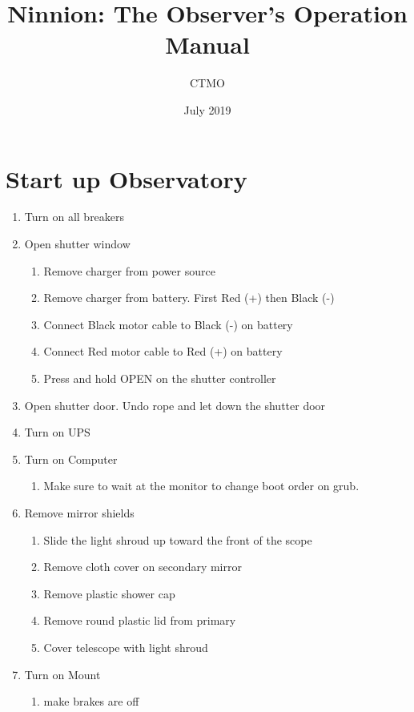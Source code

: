 \documentclass[12pt]{bookest}
\begin{document}
\title{Ninnion: The Observer's Operation Manual}
\author{CTMO}
\date{July 2019}

\maketitle
\tableofcontents


\chapter{Start up Observatory}
\begin{enumerate}
\item Turn on all breakers
\item Open shutter window
	\begin{enumerate}
	\item Remove charger from power source
	\item Remove charger  from battery. First Red (+) then Black (-)
	\item Connect Black motor cable to Black (-) on battery
	\item Connect Red motor cable to Red (+) on battery
	\item Press and hold OPEN on the shutter controller
	\end{enumerate}
\item Open shutter door. Undo rope and let down the shutter door
\item Turn on UPS
\item Turn on Computer
	\begin{enumerate}
	\item Make sure to wait at the monitor to change boot order on grub.
	\end{enumerate}
\item Remove mirror shields
	\begin{enumerate}
	\item Slide the light shroud up toward the front of the scope
	\item Remove cloth cover on secondary mirror
	\item Remove plastic shower cap 
	\item Remove round plastic lid from primary
	\item Cover telescope with light shroud
	\end{enumerate}
\item Turn on Mount
	\begin{enumerate}
	\item make brakes are off
	\end{enumerate}

\end{enumerate}
\end{document}
